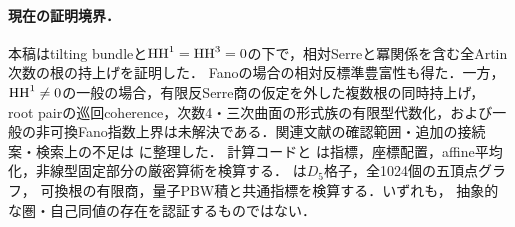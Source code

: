 \paragraph{現在の証明境界．}
本稿はtilting bundleと$\operatorname{HH}^1=\operatorname{HH}^3=0$の下で，相対Serreと冪関係を含む全Artin次数の根の持上げを証明した．
Fanoの場合の相対反標準豊富性も得た．一方，$\operatorname{HH}^1\ne0$の一般の場合，有限反Serre商の仮定を外した複数根の同時持上げ，
root pairの巡回coherence，次数4・三次曲面の形式族の有限型代数化，および一般の非可換Fano指数上界は未解決である．関連文献の確認範囲・追加の接続案・検索上の不足は
に整理した．
計算コードと
は指標，座標配置，affine平均化，非線型固定部分の厳密算術を検算する．
は$D_5$格子，全1024個の五頂点グラフ，
可換根の有限商，量子PBW積と共通指標を検算する．いずれも，
抽象的な圏・自己同値の存在を認証するものではない．

